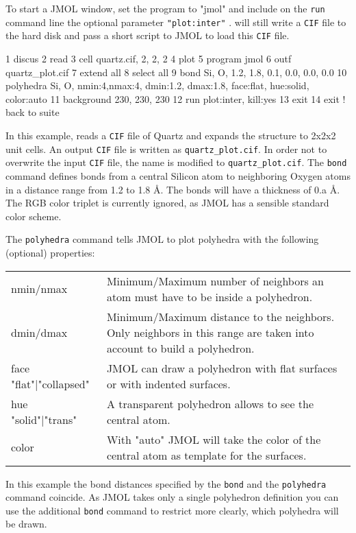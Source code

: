To start a JMOL window, set the program to "jmol" and include 
on the {\tt run} command line
the optional parameter {\tt "plot:inter"} 
. \Discus will still write a {\tt CIF} file to 
the hard disk and pass a short script to JMOL to load this {\tt CIF} file.

\begin{MacVerbatim}
 1  discus
 2  read
 3    cell quartz.cif, 2, 2, 2
 4  plot
 5    program   jmol
 6    outf      quartz_plot.cif
 7    extend    all
 8    select    all
 9    bond      Si, O, 1.2, 1.8, 0.1, 0.0, 0.0, 0.0
10    polyhedra Si, O, nmin:4,nmax:4, dmin:1.2, dmax:1.8, face:flat, hue:solid, color:auto
11    background 230, 230, 230
12    run plot:inter, kill:yes
13  exit
14  exit  ! back to suite
\end{MacVerbatim}

In this example, \Discus reads a {\tt CIF} file of Quartz and expands the 
structure to 2x2x2 unit cells. An output {\tt CIF} file is written as
{\tt quartz\_plot.cif}. In order not to overwrite the input {\tt CIF} file,
the name is modified to {\tt quartz\_plot.cif}. The {\tt bond} command
defines bonds from a central Silicon atom to neighboring Oxygen atoms
in a distance range from 1.2 to 1.8 \AA{}. The bonds will have a thickness
of 0.a \AA. The RGB color triplet is currently ignored, as JMOL has a
sensible standard color scheme. 

The {\tt polyhedra} command tells JMOL to plot polyhedra with the 
following (optional) properties:

\begin{tabularx}{\textwidth}{p{40mm}X}
nmin/nmax & Minimum/Maximum number of neighbors an atom must have to 
      be inside a polyhedron.  \\
dmin/dmax & Minimum/Maximum distance to the neighbors. Only neighbors
      in this range are taken into account to build a polyhedron. \\
face {"flat"|"collapsed"} & JMOL can draw a polyhedron with flat surfaces 
      or with indented surfaces. \\
hue {"solid"|"trans"} & A transparent polyhedron allows to see the 
      central atom. \\
color & With "auto" JMOL will take the color of the central atom 
      as template for the surfaces. \\
\end{tabularx}

In this example the bond distances specified by the {\tt bond} and the
{\tt polyhedra} command coincide. As JMOL takes only a single 
polyhedron definition you can use the additional {\tt bond} command to 
restrict more clearly, which polyhedra will be drawn.

